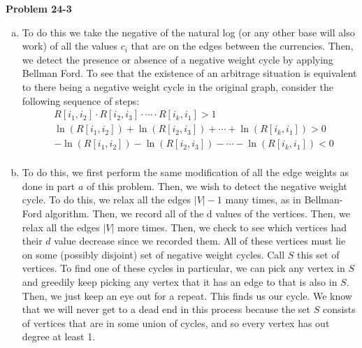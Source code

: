 \documentclass{article}
\begin{document}
\noindent\textbf{Problem 24-3}\\
\begin{enumerate}[a.]
\item
To do this we take the negative of the natural log (or any other base will also work) of all the values $c_i$ that are on the edges between the currencies. Then, we detect the presence or absence of a negative weight cycle by applying Bellman Ford. To see that the existence of an arbitrage situation is equivalent to there being a negative weight cycle in the original graph, consider the following sequence of steps:
\begin{align*}
&R[i_1,i_2]\cdot R[i_2,i_3] \cdot \cdots \cdot R[i_k,i_1] >1\\
&\ln(R[i_1,i_2])+\ln( R[i_2,i_3]) + \cdots +\ln( R[i_k,i_1]) >0\\
&-\ln(R[i_1,i_2])-\ln( R[i_2,i_3]) - \cdots -\ln( R[i_k,i_1]) <0\\
\end{align*}
\item
To do this, we first perform the same modification of all the edge weights as done in part $a$ of this problem. Then, we wish to detect the negative weight cycle. To do this, we relax all the edges $|V|-1$ many times, as in Bellman-Ford algorithm. Then, we record all of the d values of the vertices. Then, we relax all the edges $|V|$ more times. Then, we check to see which vertices had their $d$ value decrease since we recorded them. All of these vertices must lie on some (possibly disjoint) set of negative weight cycles. Call $S$ this set of vertices. To find one of these cycles in particular, we can pick any vertex in $S$ and greedily keep picking any vertex that it has an edge to that is also in $S$. Then, we just keep an eye out for a repeat. This finds us our cycle. We know that we will never get to a dead end in this process because the set $S$ consists of vertices that are in some union of cycles, and so every vertex has out degree at least 1.
\end{enumerate}
\end{document}
